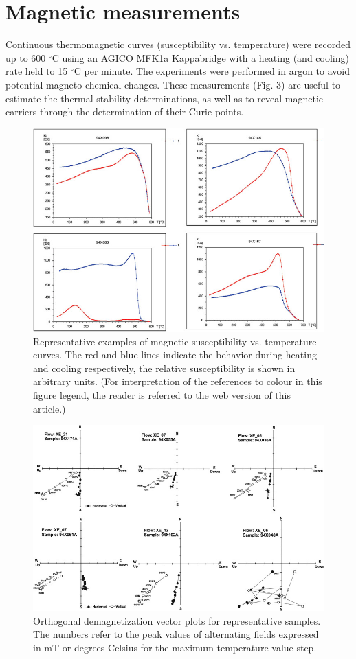 \documentclass[review]{elsarticle}
\begin{document}
\section{Magnetic measurements} 
Continuous thermomagnetic curves (susceptibility vs. temperature)
were recorded up to 600 $^{\circ}$C using an AGICO MFK1a Kappabridge with a
heating (and cooling) rate held to 15 $^{\circ}$C per minute. The experiments
were performed in argon to avoid potential magneto-chemical changes.
These measurements (Fig. 3) are useful to estimate the thermal stability determinations, as well as to reveal magnetic carriers through the determination of their Curie points.
\\
\begin{figure}
    \centering
    \includegraphics[width=12cm]{4.jpg}
    \caption{Representative examples of magnetic susceptibility vs. temperature curves. The red and blue lines indicate the behavior during heating and cooling
respectively, the relative susceptibility is shown in arbitrary units. (For interpretation of the references to colour in this figure legend, the reader is referred to the web
version of this article.)}
    \label{fig:my_label}
\end{figure}
\begin{figure}
    \centering
    \includegraphics[width=12cm]{5.jpg}
    \caption{Orthogonal demagnetization vector plots for representative samples. The numbers refer to the peak values of alternating fields expressed in mT or degrees
Celsius for the maximum temperature value step.}
    \label{fig:my_label}
\end{figure}
\end{document}
